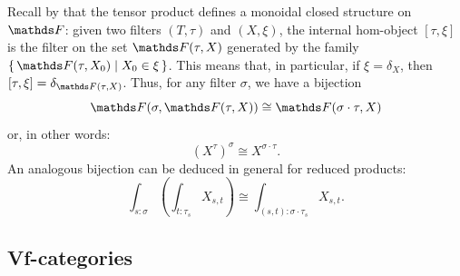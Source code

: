 \begin{rmk}\label{rmk:monoidal-structure-on-F}
    Recall by \cite[\S 4]{blassTwoClosedCategories1977} that the tensor product defines a monoidal closed structure on $\FF$:
    given two filters $(T,\tau)$ and $(X,\xi)$, the internal hom-object $[\tau, \xi]$ is the filter on the set $\FF(\tau, X)$ generated by the family $\set{ \FF(\tau, X_0) | X_0 \in \xi}$. This means that, in particular, if $\xi = \delta_X$, then $[\tau, \xi] = \delta_{\FF(\tau, X)}$. Thus, for any filter $\sigma$, we have a bijection
    \[ \FF(\sigma, \FF(\tau, X)) \cong \FF(\sigma \cdot \tau , X) \]
    or, in other words:
    \[ (X^\tau)^\sigma \cong X^{\sigma \cdot \tau}.\]
    An analogous bijection can be deduced in general for reduced products:
    \[ \int_{s:\sigma} \left(\int_{t:\tau_s} X_{s,t} \right) \cong \int_{(s,t) : \sigma\cdot \tau_s} X_{s,t}.\]

\end{rmk}


\subsection{Vf-categories}

